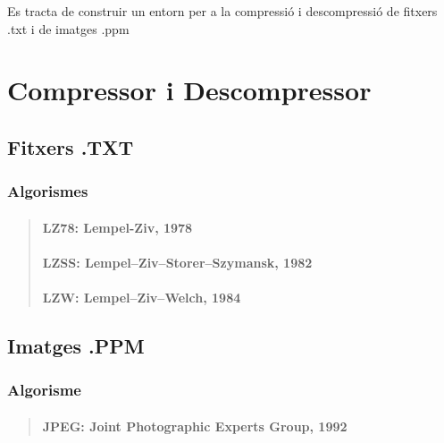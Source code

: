 Es tracta de construir un entorn per a la compressió i descompressió de fitxers .txt i de imatges .ppm

\section*{Compressor i Descompressor}

\subsection*{Fitxers .T\+XT}

\subsubsection*{Algorismes}

\begin{quote}
\paragraph*{L\+Z78\+: Lempel-\/\+Ziv, 1978}

\paragraph*{L\+Z\+SS\+: Lempel–\+Ziv–\+Storer–\+Szymansk, 1982}

\paragraph*{L\+ZW\+: Lempel–\+Ziv–\+Welch, 1984}

\end{quote}
\subsection*{Imatges .P\+PM}

\subsubsection*{Algorisme}

\begin{quote}
\paragraph*{J\+P\+EG\+: Joint Photographic Experts Group, 1992}

\end{quote}
